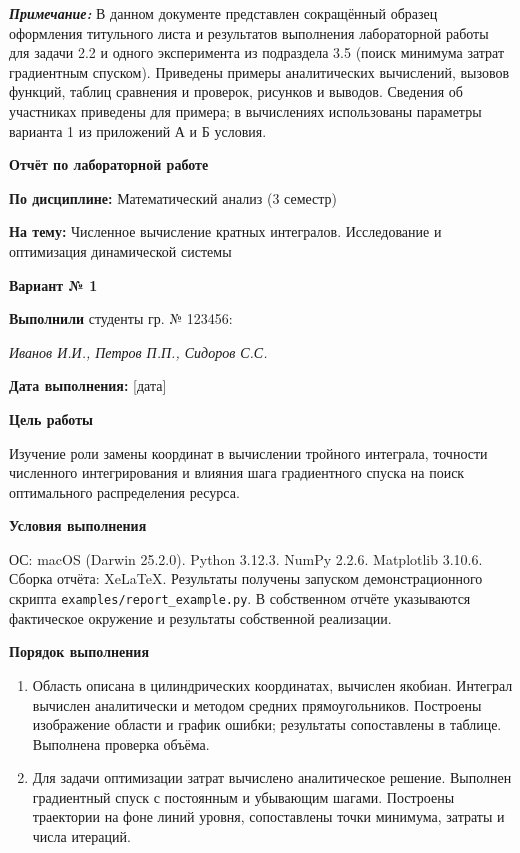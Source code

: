 \documentclass[12pt,a4paper]{article}
\newcommand{\taskhead}[1]{\par\textbf{#1}\par}
\begin{document}
\sloppy
\begin{titlepage}
{\color{black!50}
\textbf{\textit{Примечание:}} В данном документе представлен сокращённый
образец оформления титульного листа и результатов выполнения лабораторной
работы для задачи 2.2 и одного эксперимента из подраздела 3.5
(поиск минимума затрат градиентным спуском).
Приведены примеры аналитических вычислений, вызовов функций,
таблиц сравнения и проверок, рисунков и выводов.
Сведения об участниках приведены для примера; в вычислениях использованы
параметры варианта 1 из приложений А и Б условия.
\par}
\vspace{1.5cm}
{\large\bfseries Отчёт по лабораторной работе\par}
\textbf{По дисциплине:} Математический анализ (3 семестр)

\textbf{На тему:} Численное вычисление кратных интегралов.
Исследование и оптимизация динамической системы
\vspace{1cm}

\textbf{Вариант № 1}

\textbf{Выполнили} студенты гр. № 123456:

\textit{Иванов И.И., Петров П.П., Сидоров С.С.}

\textbf{Дата выполнения:} [дата]
\vspace{0.7cm}

\textbf{Цель работы}

Изучение роли замены координат в вычислении тройного интеграла,
точности численного интегрирования и влияния шага градиентного спуска
на поиск оптимального распределения ресурса.
\vspace{0.5cm}

\textbf{Условия выполнения}

ОС: macOS (Darwin 25.2.0). Python 3.12.3. NumPy 2.2.6.
Matplotlib 3.10.6. Сборка отчёта: XeLaTeX.
Результаты получены запуском демонстрационного скрипта
\texttt{examples/report\_example.py}. В собственном отчёте указываются
фактическое окружение и результаты собственной реализации.
\end{titlepage}

\taskhead{Порядок выполнения}
\begin{enumerate}
\item[2.2] Область описана в цилиндрических координатах, вычислен якобиан.
Интеграл вычислен аналитически и методом средних прямоугольников.
Построены изображение области и график ошибки; результаты сопоставлены
в таблице. Выполнена проверка объёма.
\item[3.5] Для задачи оптимизации затрат вычислено аналитическое решение.
Выполнен градиентный спуск с постоянным и убывающим шагами.
Построены траектории на фоне линий уровня, сопоставлены точки минимума,
затраты и числа итераций.
\end{enumerate}
\end{document}
